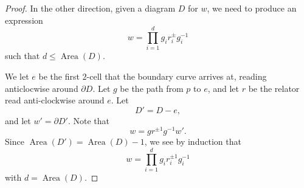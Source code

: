 \documentclass[a4paper]{article}
\DeclareMathOperator\Area{Area}
\begin{document}
\begin{proof}
%
%

  In the other direction, given a diagram $D$ for $w$, we need to produce an expression
  \[
    w = \prod_{i = 1}^d g_i r_i^{\pm} g_i^{-1}
  \]
  such that $d \leq \Area(D)$.

  We let $e$ be the first $2$-cell that the boundary curve arrives at, reading anticlocwise around $\partial D$. Let $g$ be the path from $p$ to $e$, and let $r$ be the relator read anti-clockwise around $e$. Let
  \[
    D' = D - e,
  \]
  and let $w' = \partial D'$. Note that
  \[
    w = gr^{\pm 1} g^{-1} w'.
  \]
  Since $\Area(D') = \Area(D) - 1$, we see by induction that
  \[
    w = \prod_{i = 1}^d g_i r_i^{\pm 1} g_i^{-1}
  \]
  with $d = \Area(D)$.
\end{proof}
\end{document}
